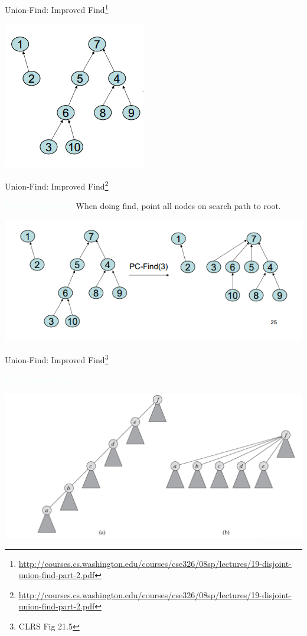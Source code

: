 \documentclass{beamer}
\newcommand{\tblue}[1]{{\Large {\textcolor{azure}{#1}}}}
\begin{document}
\begin{frame}{Union-Find: Improved Find\footnote{\url{http://courses.cs.washington.edu/courses/cse326/08sp/lectures/19-disjoint-union-find-part-2.pdf}}}

    \begin{center}
        \includegraphics[scale=0.5]{pathCompression1.png} 
    \end{center}
\end{frame}


\begin{frame}{Union-Find: Improved Find\footnote{\url{http://courses.cs.washington.edu/courses/cse326/08sp/lectures/19-disjoint-union-find-part-2.pdf}}}

    \tblue{Path Compression:} When doing find, point all nodes on search path to root.
    \begin{center}
        \includegraphics[scale=0.5]{pathCompression2.png} 
    \end{center}
\end{frame}

\begin{frame}{Union-Find: Improved Find\footnote{CLRS Fig 21.5}}

    \tblue{Path Compression:}
    \begin{center}
        \includegraphics[scale=0.3]{pathCompression4.png} 
    \end{center}
\end{frame}
\end{document}
